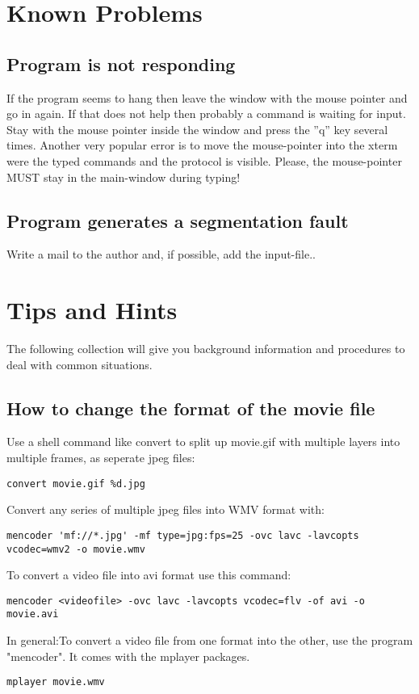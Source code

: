 \documentclass{article}
\begin{document}
\begin{appendix}
\section{\label{Known Problems}Known Problems}
\subsection{\label{Program is not responding}Program is not responding}
If the program seems to hang then leave the window with the mouse pointer and go in again. If that does not help then probably a command is waiting for input. Stay with the mouse pointer inside the window and press the ''q'' key several times. Another very popular error is to move the mouse-pointer into the xterm were the typed commands and the protocol is visible. Please, the mouse-pointer MUST stay in the main-window during typing! 

\subsection{\label{Program generates a segmentation fault}Program generates a segmentation fault}
Write a mail to the author and, if possible, add the input-file.\cite{cgx}.

\section{\label{Tips and Hints}Tips and Hints}
The following collection will give you background information and procedures to deal with common situations.

\subsection{\label{How to change the format of the movie file}How to change the format of the movie file}
Use a shell command like convert to split up movie.gif with multiple
layers into multiple frames, as seperate jpeg files:
\begin{verbatim}
convert movie.gif %d.jpg
\end{verbatim}
Convert any series of multiple jpeg files into WMV format with:
\begin{verbatim}
mencoder 'mf://*.jpg' -mf type=jpg:fps=25 -ovc lavc -lavcopts
vcodec=wmv2 -o movie.wmv
\end{verbatim}
To convert a video file into avi format use this command:
\begin{verbatim}
mencoder <videofile> -ovc lavc -lavcopts vcodec=flv -of avi -o movie.avi
\end{verbatim}
In general:To convert a video file from one format into the other, use
the program "mencoder". It comes with the mplayer packages. 
\begin{verbatim}
mplayer movie.wmv
\end{verbatim}



\end{appendix}
\end{document}
